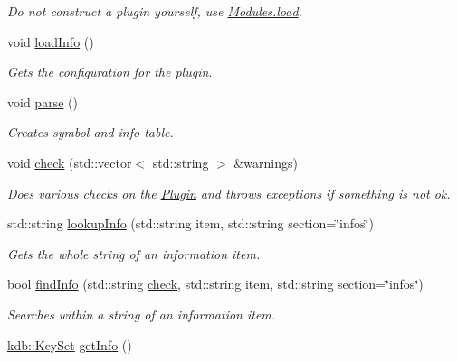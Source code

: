 \begin{DoxyCompactItemize}
\begin{DoxyCompactList}\small\item\em Do not construct a plugin yourself, use \hyperlink{classkdb_1_1tools_1_1Modules_ae8d8c91745c9f517e6e8a556f1664f69}{Modules.\+load}. \end{DoxyCompactList}\item 
void \hyperlink{classkdb_1_1tools_1_1Plugin_a3a0c6a956d1714002ef9baf8c9d99167}{load\+Info} ()
\begin{DoxyCompactList}\small\item\em Gets the configuration for the plugin. \end{DoxyCompactList}\item 
void \hyperlink{classkdb_1_1tools_1_1Plugin_adfcba2fbdeb436a1083410df804d5fb0}{parse} ()
\begin{DoxyCompactList}\small\item\em Creates symbol and info table. \end{DoxyCompactList}\item 
void \hyperlink{classkdb_1_1tools_1_1Plugin_a5bb3db65b9d87d18787da8cc65eaca65}{check} (std\+::vector$<$ std\+::string $>$ \&warnings)
\begin{DoxyCompactList}\small\item\em Does various checks on the \hyperlink{classkdb_1_1tools_1_1Plugin}{Plugin} and throws exceptions if something is not ok. \end{DoxyCompactList}\item 
std\+::string \hyperlink{classkdb_1_1tools_1_1Plugin_a5f1dc42adda8340f330eb902812e667d}{lookup\+Info} (std\+::string item, std\+::string section=\char`\"{}infos\char`\"{})
\begin{DoxyCompactList}\small\item\em Gets the whole string of an information item. \end{DoxyCompactList}\item 
bool \hyperlink{classkdb_1_1tools_1_1Plugin_a7911f8c46aea6fe4ec6fcb4788b77beb}{find\+Info} (std\+::string \hyperlink{classkdb_1_1tools_1_1Plugin_a5bb3db65b9d87d18787da8cc65eaca65}{check}, std\+::string item, std\+::string section=\char`\"{}infos\char`\"{})
\begin{DoxyCompactList}\small\item\em Searches within a string of an information item. \end{DoxyCompactList}\item 
\hyperlink{classkdb_1_1KeySet}{kdb\+::\+Key\+Set} \hyperlink{classkdb_1_1tools_1_1Plugin_aa4eac3b2b515104a0d595c717c546ec0}{get\+Info} ()

\end{DoxyCompactItemize}
